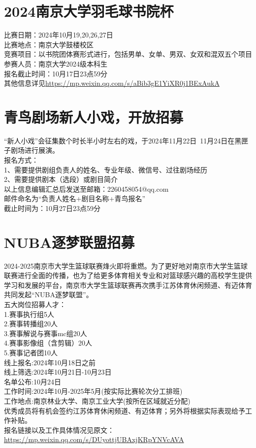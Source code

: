 \documentclass[letterpaper, 12pt]{article}
\begin{document}
\begin{multicols}{2}
\section{2024南京大学羽毛球书院杯}
比赛日期：2024年10月19,20,26,27日\\
比赛地点：南京大学鼓楼校区\\
竞赛项目：以书院团体赛形式进行，包括男单、女单、男双、女双和混双五个项目\\
参赛人员：南京大学2024级本科生\\
报名截止时间：10月17日23点59分\\
其他信息详见\url{https://mp.weixin.qq.com/s/aBib3gE1YiXR0j1BExAukA}

\section{青鸟剧场新人小戏，开放招募}
“新人小戏”会征集数个时长半小时左右的戏，于2024年11月22日~11月24日在黑匣子剧场进行展演。\\
报名方式：\\
1、需要提供剧组负责人的姓名、专业年级、微信号、过往剧场经历\\
2、需要提供剧本（选段）或剧目简介\\
以上信息编辑汇总后发送至邮箱：2260458054@qq.com\\
邮件命名为“负责人姓名+剧目名称+青鸟报名”\\
截止时间为：10月27日23点59分\\

\section{NUBA逐梦联盟招募}
2024-2025南京市大学生篮球联赛烽火即将重燃。为了更好地对南京市大学生篮球联赛进行全面的传播，也为了给更多体育相关专业和对篮球感兴趣的高校学生提供学习和发展的平台，南京市大学生篮球联赛再次携手江苏体育休闲频道、有迈体育共同发起“NUBA逐梦联盟”。\\
五大岗位招募人才：\\
1.赛事执行组5人\\
2.赛事转播组20人\\
3.赛事解说与赛事mc组20人\\
4.赛事影像组（含剪辑）20人\\
5.赛事记者团10人\\
线上报名:2024年10月18日之前\\
线上筛选:2024年10月21日-10月23日\\
名单公布:10月24日\\
工作时间:2024年10月-2025年5月(按实际比赛轮次分工排班)\\
工作地点:南京林业大学、南京工业大学(按所在区域就近分配)\\
优秀成员将有机会签约江苏体育休闲频道、有迈体育；另外将根据实际表现给予工作补贴。\\
报名链接以及工作具体情况见原文：\url{https://mp.weixin.qq.com/s/DUyottjUBAxjKRpYNVcAVA}


\end{multicols}
\end{document}
